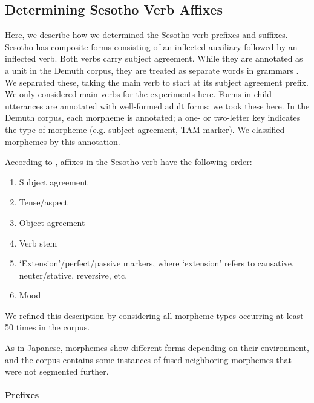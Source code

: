 \documentclass[11pt,letterpaper]{article}
\begin{document}





\subsection{Determining Sesotho Verb Affixes}

Here, we describe how we determined the Sesotho verb prefixes and suffixes.
Sesotho has composite forms consisting of an inflected auxiliary followed by an inflected verb.
Both verbs carry subject agreement.
While they are annotated as a unit in the Demuth corpus, they are treated as separate words in grammars \citep{doke1967textbook,guma1971outline}.
We separated these, taking the main verb to start at its subject agreement prefix.
We only considered main verbs for the experiments here.
Forms in child utterances are annotated with well-formed adult forms; we took these here.
In the Demuth corpus, each morpheme is annotated; a one- or two-letter key indicates the type of morpheme (e.g. subject agreement, TAM marker).
We classified morphemes by this annotation.


According to \cite{demuth1992acquisition}, affixes in the Sesotho verb have the following order:
\begin{enumerate}
    \item Subject agreement
    \item Tense/aspect
    \item Object agreement
    \item Verb stem
    \item `Extension'/perfect/passive markers, where `extension' refers to causative, neuter/stative, reversive, etc.
    \item Mood
\end{enumerate}
We refined this description by considering all morpheme types occurring at least 50 times in the corpus.

As in Japanese, morphemes show different forms depending on their environment, and the corpus contains some instances of fused neighboring morphemes that were not segmented further.


\paragraph{Prefixes}
\end{document}
